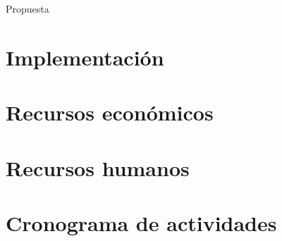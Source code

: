 \documentclass{article}
\begin{document}
Propuesta



\section{Implementación}

\section{Recursos económicos}

\section{Recursos humanos}

\section{Cronograma de actividades}



\end{document}
